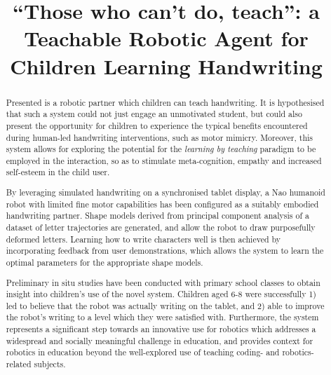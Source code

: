 \documentclass{sig-alternate}
\title{\LARGE \bf
``Those who can't do, teach'': a Teachable Robotic Agent for Children Learning Handwriting
}
\begin{document}
\maketitle

\begin{abstract}
%
%



%
%



Presented is a robotic partner which children can teach handwriting. It is
hypothesised that such a system could not just engage an unmotivated student,
but could also present the opportunity for children to experience the typical
benefits encountered during human-led handwriting interventions, such as motor
mimicry. Moreover, this system allows for exploring the potential for the
\emph{learning by teaching} paradigm to be employed in the interaction, so as to
stimulate meta-cognition, empathy and increased self-esteem in the child user. 

By leveraging simulated handwriting on a synchronised tablet display, a Nao
humanoid robot with limited fine motor capabilities has been configured as a
suitably embodied handwriting partner. Shape models derived from principal
component analysis of a dataset of letter trajectories are generated, and allow
the robot to draw purposefully deformed letters. Learning how to write
characters well is then achieved by incorporating feedback from user
demonstrations, which allows the system to learn the optimal parameters for the
appropriate shape models. 

Preliminary in situ studies have been conducted with primary school classes to obtain
insight into children's use of the novel system. 
Children aged 6-8 were successfully 1) led to believe that the robot was
actually writing on the tablet, and 2) able to improve the robot's writing to a
level which they were satisfied with. Furthermore, the system represents a
significant step towards an innovative use for robotics which addresses a
widespread and socially meaningful challenge in education, and provides context
for robotics in education beyond the well-explored use of teaching coding- and
robotics-related subjects.

\end{abstract}
\end{document}
